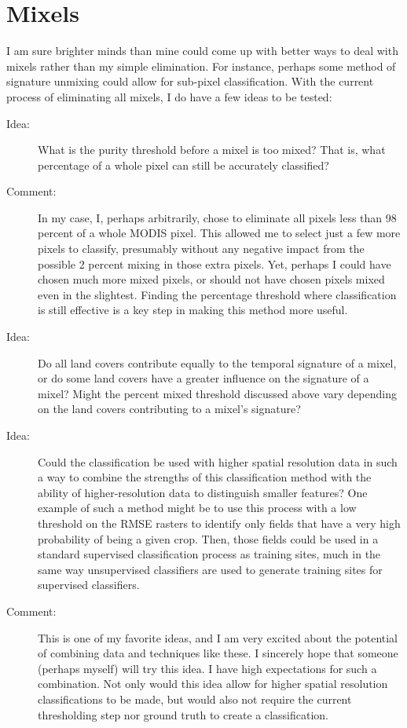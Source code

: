 \section{Mixels}

I am sure brighter minds than mine could come up with better ways to deal with mixels rather than my simple elimination. For instance, perhaps some method of signature unmixing could allow for sub-pixel classification. With the current process of eliminating all mixels, I do have a few ideas to be tested:

\begin{description}
\item[Idea:] What is the purity threshold before a mixel is too mixed? That is, what percentage of a whole pixel can still be accurately classified?

\item[Comment:] In my case, I, perhaps arbitrarily, chose to eliminate all pixels less than 98 percent of a whole MODIS pixel. This allowed me to select just a few more pixels to classify, presumably without any negative impact from the possible 2 percent mixing in those extra pixels. Yet, perhaps I could have chosen much more mixed pixels, or should not have chosen pixels mixed even in the slightest. Finding the percentage threshold where classification is still effective is a key step in making this method more useful.

\item[Idea:] Do all land covers contribute equally to the temporal signature of a mixel, or do some land covers have a greater influence on the signature of a mixel? Might the percent mixed threshold discussed above vary depending on the land covers contributing to a mixel’s signature?

\item[Idea:] Could the classification be used with higher spatial resolution data in such a way to combine the strengths of this classification method with the ability of higher-resolution data to distinguish smaller features? One example of such a method might be to use this process with a low threshold on the RMSE rasters to identify only fields that have a very high probability of being a given crop. Then, those fields could be used in a standard supervised classification process as training sites, much in the same way unsupervised classifiers are used to generate training sites for supervised classifiers.

\item[Comment:] This is one of my favorite ideas, and I am very excited about the potential of combining data and techniques like these. I sincerely hope that someone (perhaps myself) will try this idea. I have high expectations for such a combination. Not only would this idea allow for higher spatial resolution classifications to be made, but would also not require the current thresholding step nor ground truth to create a classification.
\end{description}

